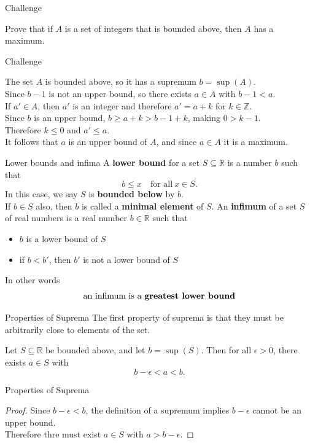 \documentclass{beamer}
\begin{document}
\begin{frame}{Challenge}
\begin{prob}
Prove that if $A$ is a set of integers that is bounded above, then $A$ has a maximum.
\end{prob}
\end{frame}

\begin{frame}{Challenge}
\begin{soln}
The set $A$ is bounded above, so it has a supremum $b=\sup(A)$. \\
\pause
Since $b-1$ is not an upper bound, so there exists $a\in A$ with $b-1 < a$. \\
\pause
If $a'\in A$, then $a'$ is an integer and therefore $a' = a+k$ for $k\in \mathbb{Z}$. \\
\pause
Since $b$ is an upper bound, $b\geq a+k>b-1+k$, making $0 > k-1$. \\
\pause
Therefore $k\leq 0$ and $a'\leq a$. \\
\pause
It follows that $a$ is an upper bound of $A$, and since $a\in A$ it is a maximum.
\end{soln}
\end{frame}

\begin{frame}{Lower bounds and infima}
A \textbf{lower bound} for a set $S\subseteq\mathbb{R}$ is a number $b$ such that
$$b \leq x\quad\text{for all}\ x\in S.$$
\pause
In this case, we say $S$ is \textbf{bounded below} by $b$.\\
\pause
If $b\in S$ also, then $b$ is called a \textbf{minimal element} of $S$.
\pause
An \textbf{infimum} of a set $S$ of real numbers is a real number $b\in\mathbb{R}$ such that
\begin{itemize}
\item $b$ is a lower bound of $S$
\item if $b<b'$, then $b'$ is not a lower bound of $S$
\end{itemize}
\pause
In other words
$$\text{an infimum is a \bf{greatest lower bound}}$$
\end{frame}

\begin{frame}{Properties of Suprema}
The first property of suprema is that they must be arbitrarily close to elements of the set.
\begin{thm}
Let $S\subseteq\mathbb{R}$ be bounded above, and let $b = \sup(S)$.
Then for all $\epsilon > 0$, there exists $a\in S$ with
$$b-\epsilon < a < b.$$
\end{thm}
\end{frame}
\begin{frame}{Properties of Suprema}
\begin{proof}
Since $b-\epsilon < b$, the definition of a supremum implies $b-\epsilon$ cannot be an upper bound.\\
\pause
Therefore thre must exist $a\in S$ with $a > b-\epsilon$.
\end{proof}
\end{frame}
\end{document}
